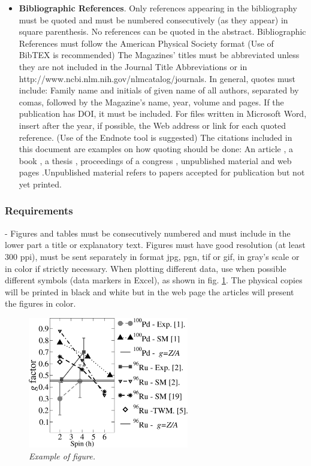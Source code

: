 \documentclass{momento}
\begin{document}
\begin{sloppypar}
\begin{itemize}
\item\textbf{Bibliographic References}. Only references appearing in the bibliography must be quoted and must be numbered consecutively (as they appear) in square parenthesis. No references can be quoted in the abstract. Bibliographic References must follow the American Physical Society format (Use of BibTEX is recommended) The Magazines’ titles must be abbreviated unless they are not included in the Journal Title Abbreviations or in http://www.ncbi.nlm.nih.gov/nlmcatalog/journals.   In general, quotes must include: Family name and initials of given name of all authors, separated by comas, followed by the Magazine’s name, year, volume and pages. If the publication has DOI, it must be included. For files written in Microsoft Word, insert after the year, if possible, the Web address or link for each quoted reference. (Use of the Endnote tool is suggested) The citations included in this document are examples on how quoting should be done: An article  \cite{1}, a book \cite{2}, a thesis  \cite{3}, proceedings of a congress \cite{4}, unpublished material  \cite{5} and web pages  \cite{6}.Unpublished material refers to papers accepted for publication but not yet printed. \vspace{-0.2cm}
\end{itemize}

\subsubsection*{Requirements}

- Figures and tables must be consecutively numbered and must include in the lower part a title or explanatory text. Figures must have good resolution (at least 300 ppi), must be sent separately in format jpg, pgn, tif or gif, in gray’s scale or in color if strictly necessary. When plotting different data, use when possible different symbols (data markers in Excel), as shown in fig. \ref{figura1}. The physical copies will be printed in black and white but in the web page the articles will present the figures in color.

\begin{figure}[!ht]
\begin{center}
\includegraphics[width=7cm]{figura1.jpg}
\end{center} \vspace{-0.3cm}
\caption{\itshape Example of figure.}  
\label{figura1}
\end{figure}


\end{sloppypar}
\end{document}
